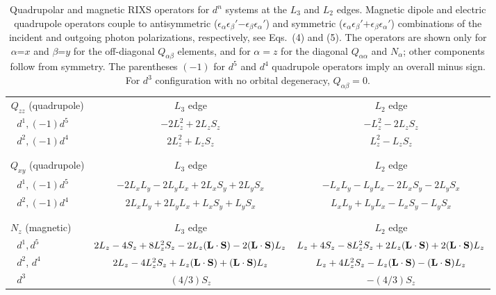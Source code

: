 \documentclass[twocolumn,prb,aps,showpacs,superscriptaddress]{revtex4-1}
\begin{document}
\begin{table*} 
	\begin{tabularx}{0.9\textwidth}{|l|c||c|}	
                \multicolumn{1}{c}{${Q_{zz}}$ (quadrupole)}& 
		\multicolumn{1}{c}{$L_3$ edge} &
		\multicolumn{1}{c}{$L_2$ edge}\\	 
		\cline{1-3}
		$~~~d^1, (-1)d^5$ &$-2L_z^2 + 2L_zS_z$ &  $-L_z^2 - 2L_zS_z$ \\
		\cline{1-3}
		$~~~d^2, (-1)d^4$ &$2L_z^2 + L_zS_z$ & $ L_z^2 - L_zS_z$ \\
		\cline{1-3}
		\multicolumn{3}{l}{}\\
		\multicolumn{3}{l}{}\\
		\multicolumn{1}{c}{${Q_{xy}}$ (quadrupole)}& 
		\multicolumn{1}{c}{$L_3$ edge} &
		\multicolumn{1}{c}{$L_2$ edge}\\
		\cline{1-3}
		$~~~d^1, (-1)d^5$ & $-2L_xL_y - 2L_yL_x +2L_xS_y + 2L_yS_x$ 
                             & $-L_xL_y - L_yL_x - 2L_xS_y - 2L_yS_x$\\
		\cline{1-3}
		$~~~d^2, (-1)d^4$ & $2L_xL_y + 2L_yL_x +L_xS_y + L_yS_x$ 
                            & $L_xL_y + L_yL_x - L_xS_y - L_yS_x$ \\
		\cline{1-3}
		\multicolumn{3}{l}{}\\
		\multicolumn{3}{l}{}\\
			\multicolumn{1}{l}{${N_{z}}$ (magnetic)}& 
			\multicolumn{1}{c}{$L_3$ edge} &
			\multicolumn{1}{c}{$L_2$ edge}\\
			\cline{1-3}
                        $~~~d^1, d^5$ & $2L_z -4S_z +8L_z^2S_z - 
2L_z({\bf L}\cdot{\bf S}) - 2({\bf L}\cdot{\bf S})L_z$ &  
$L_z +4S_z -8L_z^2S_z + 2L_z({\bf L}\cdot{\bf S}) + 2({\bf L}\cdot{\bf S})L_z$\\
			\cline{1-3}
			$~~~d^2$, $d^4$ & $2L_z - 4L_z^2S_z + 
L_z({\bf L}\cdot{\bf S}) + ({\bf L}\cdot{\bf S})L_z$ & 
$L_z + 4L_z^2S_z - L_z({\bf L}\cdot{\bf S}) - ({\bf L}\cdot{\bf S})L_z$ \\
			\cline{1-3}
			$~~~d^3$ &  $(4/3) S_z$ & $-(4/3) S_z$ \\
			\cline{1-3}
	\end{tabularx}

\caption{Quadrupolar and magnetic RIXS operators for $d^n$ systems at the
  $L_3$ and $L_2$ edges. Magnetic dipole and electric quadrupole operators 
  couple to antisymmetric 
  ($\epsilon_\alpha\epsilon_\beta'$$-$$\epsilon_\beta\epsilon_\alpha'$) and 
  symmetric ($\epsilon_\alpha\epsilon_\beta'$$+$$\epsilon_\beta\epsilon_\alpha'$)
  combinations of the incident and outgoing photon polarizations,
  respectively, see Eqs.~(4) and (5). The operators are shown only for 
  $\alpha$=$x$ and $\beta$=$y$
  for the off-diagonal $Q_{\alpha\beta}$ elements, and for $\alpha=z$ for the 
  diagonal $Q_{\alpha\alpha}$ and ${N_\alpha}$; other components follow 
  from symmetry. The parentheses $(-1)$ for $d^5$ and $d^4$ quadrupole
  operators imply an overall minus sign. For $d^3$ configuration with no
  orbital degeneracy, $Q_{\alpha\beta}=0$.}  
  \label{tab:tab1} 
\end{table*}
\end{document}
